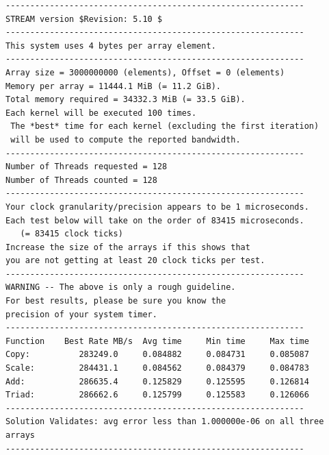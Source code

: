 \documentclass[letterpaper]{article}
\begin{document}
{\tiny
\begin{verbatim}
-------------------------------------------------------------
STREAM version $Revision: 5.10 $
-------------------------------------------------------------
This system uses 4 bytes per array element.
-------------------------------------------------------------
Array size = 3000000000 (elements), Offset = 0 (elements)
Memory per array = 11444.1 MiB (= 11.2 GiB).
Total memory required = 34332.3 MiB (= 33.5 GiB).
Each kernel will be executed 100 times.
 The *best* time for each kernel (excluding the first iteration)
 will be used to compute the reported bandwidth.
-------------------------------------------------------------
Number of Threads requested = 128
Number of Threads counted = 128
-------------------------------------------------------------
Your clock granularity/precision appears to be 1 microseconds.
Each test below will take on the order of 83415 microseconds.
   (= 83415 clock ticks)
Increase the size of the arrays if this shows that
you are not getting at least 20 clock ticks per test.
-------------------------------------------------------------
WARNING -- The above is only a rough guideline.
For best results, please be sure you know the
precision of your system timer.
-------------------------------------------------------------
Function    Best Rate MB/s  Avg time     Min time     Max time
Copy:          283249.0     0.084882     0.084731     0.085087
Scale:         284431.1     0.084562     0.084379     0.084783
Add:           286635.4     0.125829     0.125595     0.126814
Triad:         286662.6     0.125799     0.125583     0.126066
-------------------------------------------------------------
Solution Validates: avg error less than 1.000000e-06 on all three arrays
-------------------------------------------------------------
\end{verbatim}
}
\end{document}
